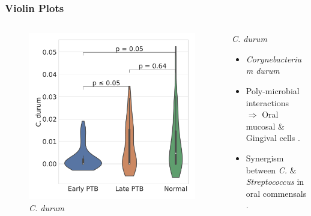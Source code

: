 \documentclass{beamer}
\begin{document}
    \begin{frame}[allowframebreaks]
        \frametitle{Violin Plots}

        \begin{columns}
            \begin{column}{0.4 \linewidth}
                \begin{figure}
                    \includegraphics[width=\linewidth]{figures/Step71_Proportion/everything.DADA2.homd.Mouth/C. durum.pdf}
                    \caption{\textit{C. durum}}
                \end{figure}
            \end{column}
            \begin{column}{0.6 \linewidth}
                \begin{block}{\textit{C. durum}}
                    \begin{itemize}
                        \item \textit{Corynebacterium durum}
                        \item Poly-microbial interactions \\
                            $\Rightarrow$ Oral mucosal \& Gingival cells \cite{Corynebacterium-1}.
                        \item Synergism between \textit{C.} \& \textit{Streptococcus} in oral commensals \cite{Corynebacterium-2}.
                    \end{itemize}
                \end{block}
            \end{column}
        \end{columns}


\end{frame}
\end{document}
